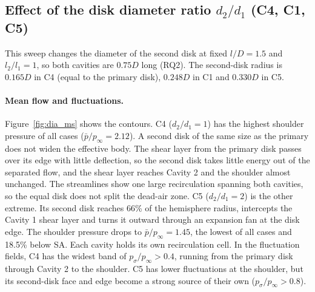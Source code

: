 \documentclass[11pt,a4paper]{article}
\newcommand{\pbar}{\bar{p}/p_\infty}
\newcommand{\psd}{p_\sigma/p_\infty}
\newcommand{\ltl}{l_2/l_1}
\newcommand{\dtd}{d_2/d_1}
\begin{document}
\subsection{Effect of the disk diameter ratio $\dtd$ (C4, C1, C5)}\label{sec:dia}

This sweep changes the diameter of the second disk at fixed $l/D = 1.5$ and $\ltl = 1$, so both cavities are $0.75D$ long (RQ2). The second-disk radius is $0.165D$ in C4 (equal to the primary disk), $0.248D$ in C1 and $0.330D$ in C5.

\paragraph{Mean flow and fluctuations.} Figure~\ref{fig:dia_ms} shows the contours. C4 ($\dtd = 1$) has the highest shoulder pressure of all cases ($\pbar = 2.12$). A second disk of the same size as the primary does not widen the effective body. The shear layer from the primary disk passes over its edge with little deflection, so the second disk takes little energy out of the separated flow, and the shear layer reaches Cavity 2 and the shoulder almost unchanged. The streamlines show one large recirculation spanning both cavities, so the equal disk does not split the dead-air zone. C5 ($\dtd = 2$) is the other extreme. Its second disk reaches 66\% of the hemisphere radius, intercepts the Cavity 1 shear layer and turns it outward through an expansion fan at the disk edge. The shoulder pressure drops to $\pbar = 1.45$, the lowest of all cases and 18.5\% below SA. Each cavity holds its own recirculation cell. In the fluctuation fields, C4 has the widest band of $\psd > 0.4$, running from the primary disk through Cavity 2 to the shoulder. C5 has lower fluctuations at the shoulder, but its second-disk face and edge become a strong source of their own ($\psd > 0.8$).
\end{document}
